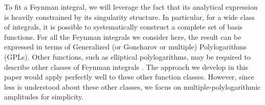 \documentclass[a4paper,11pt]{article}
\begin{document}
To fit a Feynman integral, we will leverage the fact that its analytical expression is heavily constrained by its singularity structure. In particular, for a wide class of integrals, it is possible to systematically construct a complete set of basis functions. For all the Feynman integrals we consider here, the result can be expressed in terms of Generalized (or Goncharov or multiple) Polylogarithms~\cite{Goncharov:1998kja, Goncharov:2010jf, Duhr:2012fh} (GPLs). Other functions, such as elliptical polylogarithms, may be required to describe other classes of Feynman integrals \cite{Georgoudis:2015hca, Bourjaily:2018ycu, Duhr:2022dxb, Bourjaily:2022bwx}. The approach we develop in this paper would apply perfectly well to these other function classes. However, since less is understood about these other classes, we focus on multiple-polylogarithmic amplitudes for simplicity.
\end{document}
